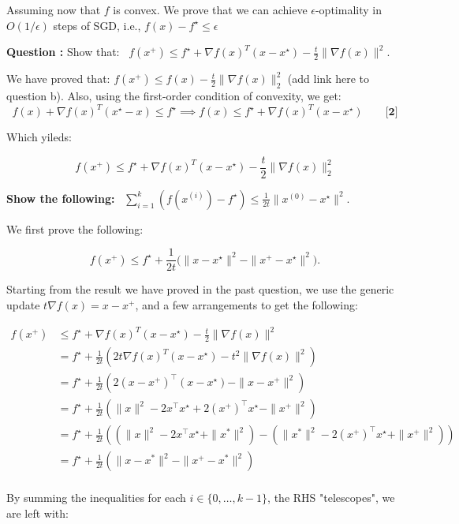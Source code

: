 \documentclass{article}
\theoremstyle{remark}
\theoremstyle{definition}
\begin{document}
Assuming now that $f$ is convex.  We prove that we can achieve $\epsilon$-optimality in $O(1/\epsilon)$ steps of SGD, i.e.,  $f(x)-f^\star \leq \epsilon$
\begin{tcolorbox}
\textbf{Question :} Show that:
$
\,\,\, f(x^+) \leq f^\star + \nabla f(x)^T (x-x^\star) -
\frac{t}{2}\|\nabla f(x)\|^2. 
$
\end{tcolorbox} 


We have proved that: $f(x^+) \leq f(x) - \frac{t}{2} \|\nabla f(x)\|_2^2$ (add link here to question b). Also, using the first-order condition of convexity, we get:
\[
f(x) + \nabla f(x)^T (x^\star - x) \leq f^\star 
    \implies 
f(x) \leq f^\star + \nabla f(x)^T (x - x^\star)  \quad \quad \textbf{[2]} 
\]

Which yileds:

\[ f(x^+) \leq  f^\star + \nabla f(x)^T (x - x^\star) - \frac{t}{2} \|\nabla f(x)\|_2^2 \]

\begin{tcolorbox}
\textbf{Show the following:}
$
\,\,\, \sum_{i=1}^k ( f(x^{(i)}) - f^\star ) \leq
\frac{1}{2t} \|x^{(0)} - x^\star\|^2. 
$
\end{tcolorbox}
We first prove the following:

\[
 f(x^+) \leq f^\star + \frac{1}{2t} \big( \|x-x^\star\|^2 - \|x^+ - x^\star\|^2 \big). 
\]

Starting from the result we have proved in the past question, we use the generic update $t \nabla f(x) = x - x^+$, and a few arrangements to get the following:

\begin{align*}
f(x^+) &\leq f^\star + \nabla f(x)^T (x-x^\star) -
\frac{t}{2}\|\nabla f(x)\|^2 \\
&= f^\star + \frac{1}{2t} ( 2t \nabla f(x)^T (x-x^\star) - t^2 \|\nabla f(x)\|^2 ) \\
&= f^\star + \frac{1}{2t} (2 (x-x^+)^\intercal (x-x^\star) - \|x - x^+\|^2 ) \\
&= f^\star + \frac{1}{2t} (\|x\|^2 - 2x^\intercal x^\star + 2(x^+)^\intercal x^\star - \|x^+\|^2 ) \\
&= f^\star + \frac{1}{2t} ((\|x\|^2 - 2x^\intercal x^\star + \|x^*\|^2) -( \|x^*\|^2 - 2(x^+)^\intercal x^\star + \|x^+\|^2 )) \\
&= f^\star + \frac{1}{2t} (\|x - x^*\|^2 - \|x^+ - x^*\|^2 ) \\
\end{align*}


By summing the inequalities for each $i \in \{0, \ldots , k-1\}$, the RHS "telescopes", we are left with:
\end{document}
